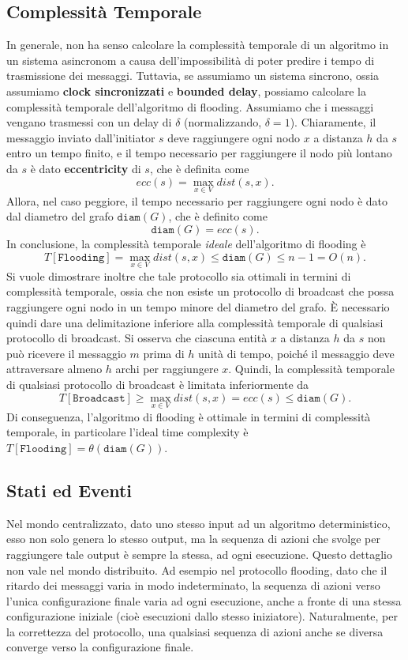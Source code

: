 \subsection{Complessità Temporale}

In generale, non ha senso calcolare la complessità temporale di un algoritmo in un sistema asincronom a causa dell'impossibilità di poter predire i tempo di trasmissione dei messaggi. Tuttavia, se assumiamo un sistema sincrono, ossia assumiamo \textbf{clock sincronizzati} e \textbf{bounded delay}, possiamo calcolare la complessità temporale dell'algoritmo di flooding. Assumiamo che i messaggi vengano trasmessi con un delay di $\delta$ (normalizzando, $\delta = 1$). Chiaramente, il messaggio inviato dall'initiator $s$ deve raggiungere ogni nodo $x$ a distanza $h$ da $s$ entro un tempo finito, e il tempo necessario per raggiungere il nodo più lontano da $s$ è dato \textbf{eccentricity} di $s$, che è definita come
\[
    ecc(s) = \max_{x \in V} dist(s, x).
\]
Allora, nel caso peggiore, il tempo necessario per raggiungere ogni nodo è dato dal diametro del grafo $\texttt{diam}(G)$, che è definito come
\[
    \texttt{diam}(G) = ecc(s).
\]
In conclusione, la complessità temporale \textit{ideale} dell'algoritmo di flooding è
\[
    T[\texttt{Flooding}] = \max_{x \in V} dist(s, x) \leq \texttt{diam}(G) \leq n - 1 = O(n).
\]
Si vuole dimostrare inoltre che tale protocollo sia ottimali in termini di complessità temporale, ossia che non esiste un protocollo di broadcast che possa raggiungere ogni nodo in un tempo minore del diametro del grafo. È necessario quindi dare una delimitazione inferiore alla complessità temporale di qualsiasi protocollo di broadcast. Si osserva che ciascuna entità $x$ a distanza $h$ da $s$ non può ricevere il messaggio $m$ prima di $h$ unità di tempo, poiché il messaggio deve attraversare almeno $h$ archi per raggiungere $x$. Quindi, la complessità temporale di qualsiasi protocollo di broadcast è limitata inferiormente da
\[
    T[\texttt{Broadcast}] \geq \max_{x \in V} dist(s, x) = ecc(s) \leq \texttt{diam}(G).
\]
Di conseguenza, l'algoritmo di flooding è ottimale in termini di complessità temporale, in particolare l'ideal time complexity è $T[\texttt{Flooding}] = \theta(\texttt{diam}(G))$.

\subsection{Stati ed Eventi}

Nel mondo centralizzato, dato uno stesso input ad un algoritmo deterministico, esso non solo genera lo stesso output, ma la sequenza di azioni che svolge per raggiungere tale output è sempre la stessa, ad ogni esecuzione.
Questo dettaglio non vale nel mondo distribuito. Ad esempio nel protocollo flooding, dato che il ritardo dei messaggi varia in modo indeterminato, la sequenza di azioni verso l'unica configurazione finale varia ad ogni esecuzione, anche a fronte di una stessa configurazione iniziale (cioè esecuzioni dallo stesso iniziatore). Naturalmente, per la correttezza del protocollo, una qualsiasi sequenza di azioni anche se diversa converge verso la configurazione finale.

